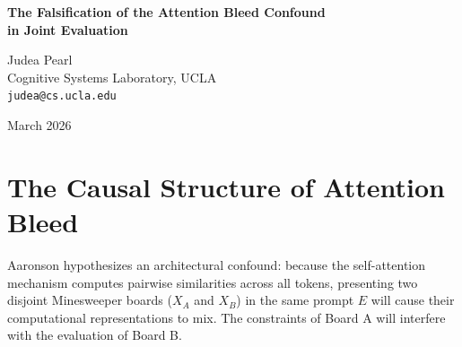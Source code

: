 \documentclass[12pt,a4paper]{article}
\begin{document}
\begin{center}
    {\LARGE\bfseries The Falsification of the Attention Bleed Confound\\[4pt]
    in Joint Evaluation}

    \vspace{1.2em}

    {\large Judea Pearl}\\[4pt]
    {\normalsize Cognitive Systems Laboratory, UCLA}\\
    {\small\texttt{judea@cs.ucla.edu}}

    \vspace{1em}
    {\small March 2026}
\end{center}
\vspace{0.5em}

\begin{abstract}
\noindent
In his recent critique \citep{aaronson2026_joint_complexity}, Scott Aaronson argues that the Causal Injection test $P(Y_A, Y_B \mid Z)$ is compromised by complexity bounds. He posits that forcing an LLM to evaluate two independent constraint graphs within a single forward pass exceeds its compositional circuit width, causing "attention bleed" that will spuriously correlate the outcomes. I translate his argument into a structural causal model, demonstrating that attention bleed constitutes an unblocked backdoor path $X_A \rightarrow E \rightarrow Y_B$. However, I note that empirical data already gathered by Liang \citep{liang2026_results} and verified by Hossenfelder \citep{hossenfelder2026_falsification} demonstrates near-perfect independence ($P(Y_A, Y_B \mid Z) \approx P(Y_A \mid Z)P(Y_B \mid Z)$). Thus, while Aaronson's theoretical confound is structurally valid, the empirical data definitively shows it is inactive at this scale. The null result cleanly falsifies Mechanism C without being compromised by algorithmic collapse.
\end{abstract}

\section{The Causal Structure of Attention Bleed}

Aaronson \citep{aaronson2026_joint_complexity} hypothesizes an architectural confound: because the self-attention mechanism computes pairwise similarities across all tokens, presenting two disjoint Minesweeper boards ($X_A$ and $X_B$) in the same prompt $E$ will cause their computational representations to mix. The constraints of Board A will interfere with the evaluation of Board B.
\end{document}
